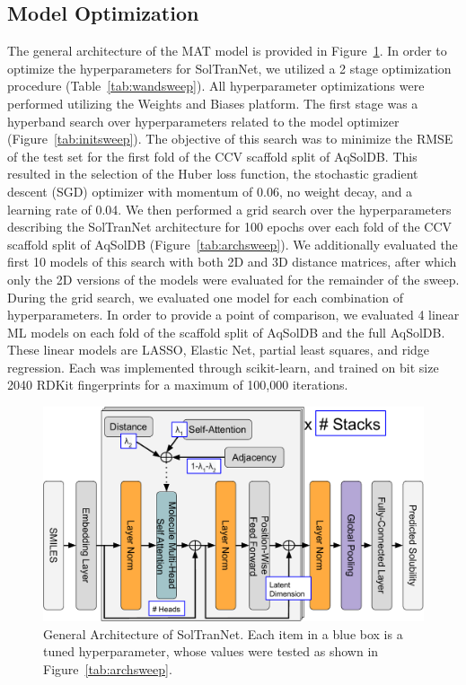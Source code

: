 \documentclass[journal=jmcmar,manuscript=article]{achemso}
\begin{document}
\subsection{Model Optimization}
The general architecture of the MAT model is provided in Figure~\ref{fig:architecture}.
In order to optimize the hyperparameters for SolTranNet, we utilized a 2 stage optimization procedure (Table~\ref{tab:wandsweep}).
All hyperparameter optimizations were performed utilizing the Weights and Biases platform\cite{wandb}.
The first stage was a hyperband search over hyperparameters related to the model optimizer (Figure~\ref{tab:initsweep}). 
The objective of this search was to minimize the RMSE of the test set for the first fold of the CCV scaffold split of AqSolDB.
This resulted in the selection of the Huber loss function, the stochastic gradient descent (SGD) optimizer with momentum of 0.06, no weight decay, and a learning rate of 0.04.
We then performed a grid search over the hyperparameters describing the SolTranNet architecture for 100 epochs over each fold of the CCV scaffold split of AqSolDB (Figure~\ref{tab:archsweep}).
We additionally evaluated the first 10 models of this search with both 2D and 3D distance matrices, after which only the 2D versions of the models were evaluated for the remainder of the sweep.
During the grid search, we evaluated one model for each combination of hyperparameters.
In order to provide a point of comparison, we evaluated 4 linear ML models on each fold of the scaffold split of AqSolDB and the full AqSolDB.
These linear models are LASSO, Elastic Net, partial least squares, and ridge regression.
Each was implemented through scikit-learn\cite{scikit-learn}, and trained on bit size 2040 RDKit fingerprints for a maximum of 100,000 iterations.

\begin{figure}[tb]
    \centering
    \includegraphics[width=0.7\linewidth]{figures/soltrannet_architecture.pdf}
    \caption{General Architecture of SolTranNet. Each item in a blue box is a tuned hyperparameter, whose values were tested as shown in Figure~\ref{tab:archsweep}.}
    \label{fig:architecture}
\end{figure}
\end{document}
